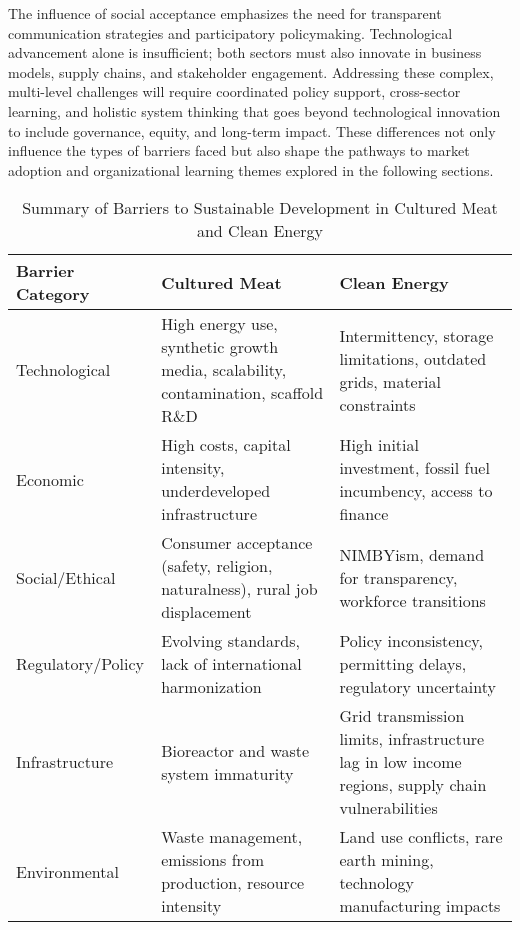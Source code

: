 	The influence of social acceptance emphasizes the need for transparent communication strategies and participatory policymaking. Technological advancement alone is insufficient; both sectors must also innovate in business models, supply chains, and stakeholder engagement. Addressing these complex, multi-level challenges will require coordinated policy support, cross-sector learning, and holistic system thinking that goes beyond technological innovation to include governance, equity, and long-term impact. These differences not only influence the types of barriers faced but also shape the pathways to market adoption and organizational learning themes explored in the following sections. \\
	
\begin{table}[h!]
	\centering
	\caption{Summary of Barriers to Sustainable Development in Cultured Meat and Clean Energy}
	\label{tab:barriers_summary}
	\begin{tabularx}{\textwidth}{@{}lXX@{}}
		\toprule
		\textbf{Barrier Category} & \textbf{Cultured Meat}                                                                     & \textbf{Clean Energy}                                                              \\ \midrule
		Technological             & High energy use, synthetic growth media, scalability, contamination, scaffold R\&D          & Intermittency, storage limitations, outdated grids, material constraints        \\ \addlinespace
		Economic                  & High costs, capital intensity, underdeveloped infrastructure                             & High initial investment, fossil fuel incumbency, access to finance             \\ \addlinespace
		Social/Ethical            & Consumer acceptance (safety, religion, naturalness), rural job displacement              & NIMBYism, demand for transparency, workforce transitions                       \\ \addlinespace
		Regulatory/Policy         & Evolving standards, lack of international harmonization                                  & Policy inconsistency, permitting delays, regulatory uncertainty                \\ \addlinespace
		Infrastructure            & Bioreactor and waste system immaturity                                                   & Grid transmission limits, infrastructure lag in low income regions, supply chain vulnerabilities \\ \addlinespace
		Environmental             & Waste management, emissions from production, resource intensity                          & Land use conflicts, rare earth mining, technology manufacturing impacts        \\ \bottomrule
	\end{tabularx}
\end{table}
	
